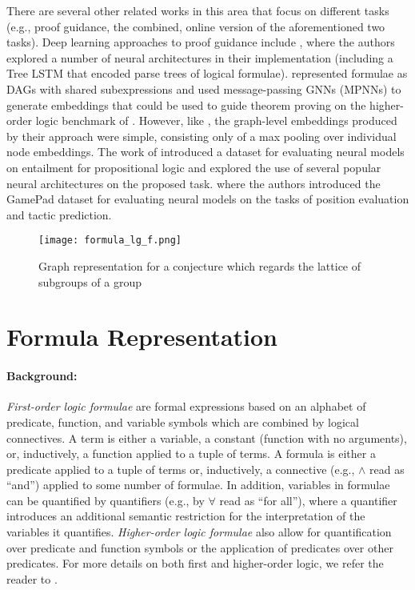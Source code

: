 \documentclass{article}
\begin{document}
There are several other related works in this area that focus on different tasks (e.g., proof guidance, the combined, online version of the aforementioned two tasks). Deep learning approaches to proof guidance include \cite{loos2017deep}, where the authors explored a number of neural architectures in their implementation (including a Tree LSTM that encoded parse trees of logical formulae). \cite{paliwal2019graph} represented formulae as DAGs with shared subexpressions and used message-passing GNNs (MPNNs) to generate embeddings that could be used to guide theorem proving on the higher-order logic benchmark of \cite{bansal2019holist}. However, like \cite{wang2017premise}, the graph-level embeddings produced by their approach were simple, consisting only of a max pooling over individual node embeddings. The work of \cite{evans2018can} introduced a dataset for evaluating neural models on entailment for propositional logic and explored the use of several popular neural architectures on the proposed task. \cite{huang2018gamepad} where the authors introduced the GamePad dataset for evaluating neural models on the tasks of position evaluation and tactic prediction.

\begin{figure*}[t]
\centering
    \footnotesize
\texttt{[image: formula\_lg\_f.png]}
    \caption{Graph representation for a conjecture which regards the lattice of subgroups of a group}
    \label{fig:formula}
    \vspace{-0.1in}
\end{figure*} 
\section{Formula Representation}
\label{sec:formulas}


\paragraph{Background:} {\em First-order logic formulae} are formal expressions based on an alphabet of predicate, function, and variable symbols which are combined by logical connectives.
A term is either a variable, a constant (function with no arguments), or, inductively, a function applied to a tuple of terms. A formula is either a predicate applied to a tuple of terms or, inductively, a connective (e.g., $\wedge$ read as ``and'') applied to some number of formulae. In addition, variables in formulae can be quantified by quantifiers (e.g., by $\forall$ read as ``for all''), where a quantifier introduces an additional semantic restriction for the interpretation of the variables it quantifies.
{\em Higher-order logic formulae} also allow for quantification over predicate and function symbols or the application of predicates over other predicates. For more details on both first and higher-order logic, we refer the reader to \cite{taylor1999practical}.
\end{document}
